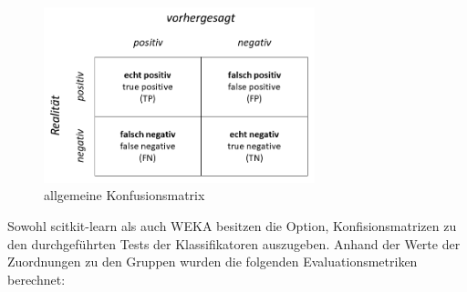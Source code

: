 \begin{figure}[]
    \centering
    \includegraphics[width=0.7\textwidth]{images/Confusion}
    \caption{allgemeine Konfusionsmatrix\label{fig:confu}}
\end{figure}

Sowohl scitkit-learn als auch WEKA besitzen die Option, Konfisionsmatrizen zu den durchgeführten Tests der Klassifikatoren auszugeben. Anhand der Werte der Zuordnungen zu den Gruppen wurden die folgenden Evaluationsmetriken berechnet: 

